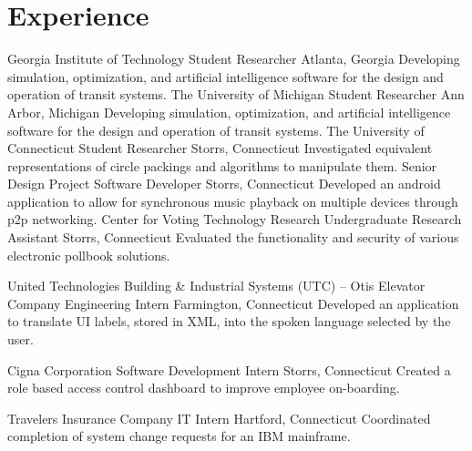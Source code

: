 \section{Experience}
		{Georgia Institute of Technology}
		{Student Researcher}
		{Atlanta, Georgia}{}
		{Developing simulation, optimization, and artificial intelligence software for the design and operation of transit systems.}
		{The University of Michigan}
		{Student Researcher}
		{Ann Arbor, Michigan}{}
		{Developing simulation, optimization, and artificial intelligence software for the design and operation of transit systems.}
		{The University of Connecticut}
		{Student Researcher}
		{Storrs, Connecticut}{}
		{Investigated equivalent representations of circle packings and algorithms to manipulate them.}
		{Senior Design Project}
		{Software Developer}
		{Storrs, Connecticut}{}
		{Developed an android application to allow for synchronous music playback on multiple devices through p2p networking.}
		{Center for Voting Technology Research}
		{Undergraduate Research Assistant}
		{Storrs, Connecticut}{}
		{Evaluated the functionality and security of various electronic pollbook solutions.}

		{United Technologies Building \& Industrial Systems (UTC) -- Otis Elevator Company}
		{Engineering Intern}
		{Farmington, Connecticut}{}
		{Developed an application to translate UI labels, stored in XML, into the spoken language selected by the user.}

		{Cigna Corporation}
		{Software Development Intern}
		{Storrs, Connecticut}{}
		{Created a role based access control dashboard to improve employee on-boarding.}

		{Travelers Insurance Company}
		{IT Intern}
		{Hartford, Connecticut}{}
		{Coordinated completion of system change requests for an IBM mainframe.}
